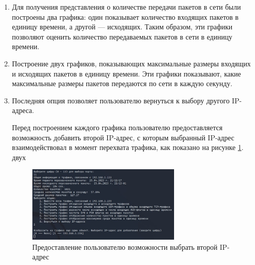 \documentclass[bachelor, och, coursework]{SCWorks}
\begin{document}
\begin{enumerate}
\begin{enumerate}
    Частота PSH-флагов вычисляется по формуле 
    
    \begin{center}
      $r_{psh} = \frac{V_{P_{in}}}{V_{tcp}}$,
    \end{center}
    
    где $V_{P_{in}}$ число входящих TCP-пакетов, в которых установлен флаг PSH = 1, $V_{tcp}$ --- число входящих TCP-пакетов в единицу времени.
    Флаг PSH (Push) в TCP-заголовке используется для указания конечной точке передачи данных о том, что все буферизованные данные должны быть 
    немедленно отправлены получателю, а не ждать буферизации следующих данных. Когда отправитель устанавливает флаг PSH в заголовке TCP-сегмента, 
    он указывает получателю, что данные в этом сегменте должны быть переданы верхнему уровню протокола немедленно, без буферизации на приемной стороне.
    Таким образом, если значение величины $r_{psh}$ резко возросло в некоторый промежуток времени, значит за это время
    одно устройcтво успело передать другому устройству большое количество пакетов.

    \item Для получения представления о количестве передачи пакетов в сети были построены два графика: один показывает количество входящих пакетов 
    в единицу времени, а другой --- исходящих. Таким образом, эти графики позволяют оценить количество передаваемых пакетов в сети в единицу времени.
    \item Построение двух графиков, показывающих максимальные размеры входящих и исходящих пакетов в единицу времени. Эти графики показывают, какие 
    максимальные размеры пакетов передаются по сети в каждую секунду.
    \item Последняя опция позволяет пользователю вернуться к выбору другого IP-адреса.

    Перед построением каждого графика пользователю предоставляется возможность добавить второй IP-адрес, с которым выбранный IP-адрес взаимодействовал 
    в момент перехвата трафика, как показано на рисунке \ref{cmd-2ndip}.
двух 
    \begin{figure}[H]
      \centering
      \includegraphics[width=0.7\textwidth]{photo/cmd-2ndip.jpg}
      \caption{Предоставление пользователю возможности выбрать второй IP-адрес}
      \label{cmd-2ndip}
    \end{figure}


\end{enumerate}
\end{enumerate}
\end{document}

